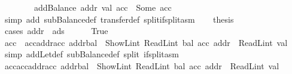 \begin{isabellebody}
\ \ \ \ \ \ \ {\isacharasterisk}{\kern0pt}{\isacharasterisk}{\kern0pt}{\isacharcolon}{\kern0pt}\ {\isachardoublequoteopen}addBalance\ addr\ val\ acc{\isacharprime}{\kern0pt}{\isacharprime}{\kern0pt}\ {\isacharequal}{\kern0pt}\ Some\ acc{\isacharprime}{\kern0pt}{\isachardoublequoteclose}\ \isamarkupfalse%
\ {\isacharparenleft}{\kern0pt}simp\ add{\isacharcolon}{\kern0pt}\ subBalance{\isacharunderscore}{\kern0pt}def\ transfer{\isacharunderscore}{\kern0pt}def\ split{\isacharcolon}{\kern0pt}if{\isacharunderscore}{\kern0pt}split{\isacharunderscore}{\kern0pt}asm{\isacharparenright}{\kern0pt}\isanewline
\isanewline
\ \ \isamarkupfalse%
\ {\isacharquery}{\kern0pt}thesis\isanewline
\ \ \isamarkupfalse%
\ {\isacharparenleft}{\kern0pt}cases\ {\isachardoublequoteopen}addr\ {\isacharequal}{\kern0pt}\ ads{\isachardoublequoteclose}{\isacharparenright}{\kern0pt}\isanewline
\ \ \ \ \isamarkupfalse%
\ True\isanewline
\ \ \ \ \isamarkupfalse%
\ {\isacharasterisk}{\kern0pt}\ \isamarkupfalse%
\ {\isachardoublequoteopen}acc{\isacharprime}{\kern0pt}{\isacharprime}{\kern0pt}\ {\isacharequal}{\kern0pt}\ acc{\isacharparenleft}{\kern0pt}addr{\isacharcolon}{\kern0pt}{\isacharequal}{\kern0pt}acc\ addr{\isasymlparr}bal\ {\isacharcolon}{\kern0pt}{\isacharequal}{\kern0pt}\ ShowL\isactrlsub i\isactrlsub n\isactrlsub t\ {\isacharparenleft}{\kern0pt}ReadL\isactrlsub i\isactrlsub n\isactrlsub t\ {\isacharparenleft}{\kern0pt}bal\ {\isacharparenleft}{\kern0pt}acc\ addr{\isacharparenright}{\kern0pt}{\isacharparenright}{\kern0pt}\ {\isacharminus}{\kern0pt}\ ReadL\isactrlsub i\isactrlsub n\isactrlsub t\ val{\isacharparenright}{\kern0pt}{\isasymrparr}{\isacharparenright}{\kern0pt}{\isachardoublequoteclose}\ \isamarkupfalse%
\ {\isacharparenleft}{\kern0pt}simp\ add{\isacharcolon}{\kern0pt}Let{\isacharunderscore}{\kern0pt}def\ subBalance{\isacharunderscore}{\kern0pt}def\ split{\isacharcolon}{\kern0pt}\ if{\isacharunderscore}{\kern0pt}split{\isacharunderscore}{\kern0pt}asm{\isacharparenright}{\kern0pt}\isanewline
\ \ \ \ \isamarkupfalse%
\ \isamarkupfalse%
\ {\isacharasterisk}{\kern0pt}{\isacharasterisk}{\kern0pt}\ \isamarkupfalse%
\ {\isachardoublequoteopen}acc{\isacharprime}{\kern0pt}{\isacharequal}{\kern0pt}acc{\isacharprime}{\kern0pt}{\isacharprime}{\kern0pt}{\isacharparenleft}{\kern0pt}addr{\isacharcolon}{\kern0pt}{\isacharequal}{\kern0pt}acc{\isacharprime}{\kern0pt}{\isacharprime}{\kern0pt}\ addr{\isasymlparr}bal\ {\isacharcolon}{\kern0pt}{\isacharequal}{\kern0pt}\ ShowL\isactrlsub i\isactrlsub n\isactrlsub t\ {\isacharparenleft}{\kern0pt}ReadL\isactrlsub i\isactrlsub n\isactrlsub t\ {\isacharparenleft}{\kern0pt}bal\ {\isacharparenleft}{\kern0pt}acc{\isacharprime}{\kern0pt}{\isacharprime}{\kern0pt}\ addr{\isacharparenright}{\kern0pt}{\isacharparenright}{\kern0pt}\ {\isacharplus}{\kern0pt}\ ReadL\isactrlsub i\isactrlsub n\isactrlsub t\ val{\isacharparenright}{\kern0pt}{\isasymrparr}{\isacharparenright}{\kern0pt}{\isachardoublequoteclose}\ \isamarkupfalse%

\end{isabellebody}
